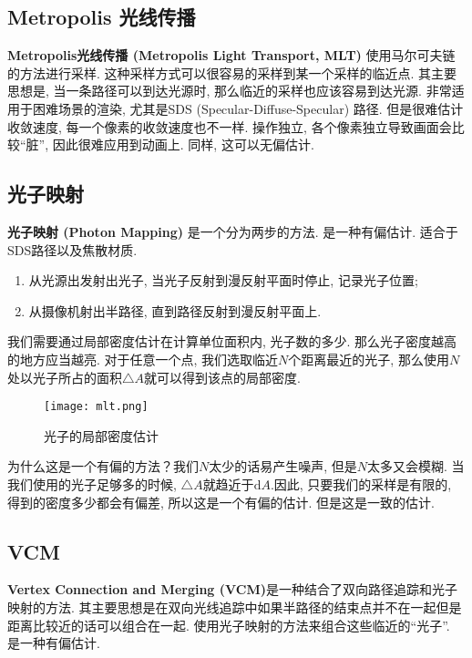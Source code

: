 \subsection{Metropolis 光线传播}

\textbf{Metropolis光线传播 (Metropolis Light Transport, MLT) }使用马尔可夫链的方法进行采样. 这种采样方式可以很容易的采样到某一个采样的临近点. 其主要思想是, 当一条路径可以到达光源时, 那么临近的采样也应该容易到达光源. 非常适用于困难场景的渲染, 尤其是SDS (Specular-Diffuse-Specular) 路径. 但是很难估计收敛速度, 每一个像素的收敛速度也不一样. 操作独立, 各个像素独立导致画面会比较``脏”, 因此很难应用到动画上. 同样, 这可以无偏估计. 

\subsection{光子映射}

\textbf{光子映射 (Photon Mapping) }是一个分为两步的方法. 是一种有偏估计. 适合于SDS路径以及焦散材质. 
\begin{enumerate}
	\item 从光源出发射出光子, 当光子反射到漫反射平面时停止, 记录光子位置; 
	\item 从摄像机射出半路径, 直到路径反射到漫反射平面上. 
\end{enumerate}

我们需要通过局部密度估计在计算单位面积内, 光子数的多少. 那么光子密度越高的地方应当越亮. 对于任意一个点, 我们选取临近$N$个距离最近的光子, 那么使用$N$处以光子所占的面积$\triangle A$就可以得到该点的局部密度. 

\begin{figure}[H]
	\centering
	\texttt{[image: mlt.png]}
	\caption{光子的局部密度估计}
	\label{fig:mlt}
\end{figure}

为什么这是一个有偏的方法？我们$N$太少的话易产生噪声, 但是$N$太多又会模糊. 当我们使用的光子足够多的时候, $\triangle A$就趋近于$\text{d}A$.因此, 只要我们的采样是有限的, 得到的密度多少都会有偏差, 所以这是一个有偏的估计. 但是这是一致的估计. 

\subsection{VCM}

\textbf{Vertex Connection and Merging (VCM)}是一种结合了双向路径追踪和光子映射的方法. 其主要思想是在双向光线追踪中如果半路径的结束点并不在一起但是距离比较近的话可以组合在一起. 使用光子映射的方法来组合这些临近的``光子”. 是一种有偏估计. 

